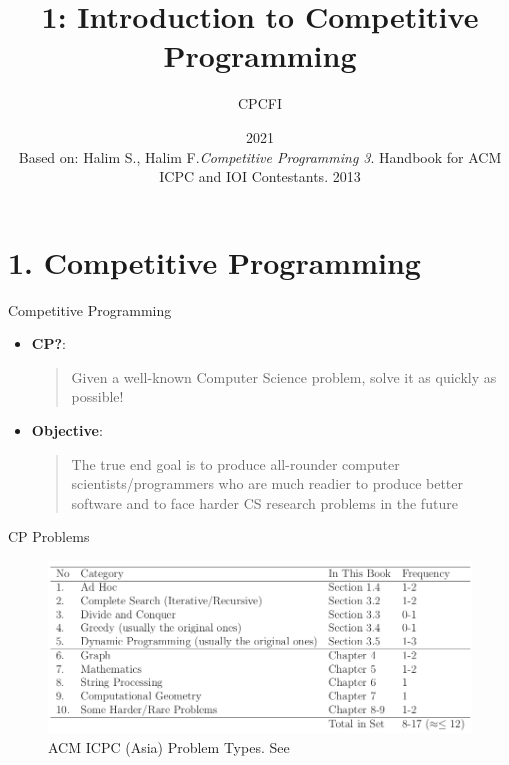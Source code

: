 \documentclass{beamer}
\title{1: Introduction to Competitive Programming}
\author{CPCFI}
\institute{UNAM's School of Engineering}
\date{2021 \\ \vspace{0.5cm} \scriptsize{Based on: Halim S., Halim F.\textit{Competitive Programming 3}}. Handbook for ACM ICPC and IOI Contestants. 2013}
\begin{document}
\frame{\titlepage}

\section{1. Competitive Programming}
\begin{frame}{Competitive Programming}
    \begin{itemize}
        \item \textbf{CP?}:
            \begin{quote}
                Given a well-known Computer Science problem, solve it as quickly as possible!
            \end{quote}
        \item \textbf{Objective}:
            \begin{quote}
                The true end goal is to produce all-rounder computer scientists/programmers who are much readier to produce better software and to face harder CS research problems in the future
            \end{quote}
    \end{itemize}
\end{frame}

\begin{frame}{CP Problems}
    \begin{figure}
        \centering
        \includegraphics[scale=0.3]{imgs/1-CompetitiveProgramming/cp_problems.png}
        \caption{ACM ICPC (Asia) Problem Types. See \cite{Halim}}
        \label{fig:CP_problems_categories}
    \end{figure}
\end{frame}
\end{document}
